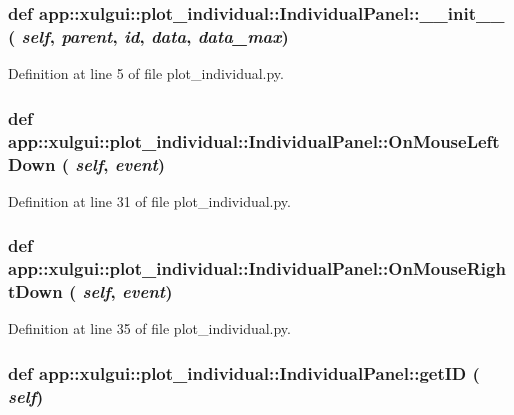 \subsubsection{\setlength{\rightskip}{0pt plus 5cm}def app::xulgui::plot\_\-individual::IndividualPanel::\_\-\_\-init\_\-\_\- ( {\em self},  {\em parent},  {\em id},  {\em data},  {\em data\_\-max})}\label{classapp_1_1xulgui_1_1plot__individual_1_1IndividualPanel_1357ff5f3ba338c72ae66861b349fec7}




Definition at line 5 of file plot\_\-individual.py.
\subsubsection{\setlength{\rightskip}{0pt plus 5cm}def app::xulgui::plot\_\-individual::IndividualPanel::OnMouseLeftDown ( {\em self},  {\em event})}\label{classapp_1_1xulgui_1_1plot__individual_1_1IndividualPanel_4df13e3b658e912d37568c6c99ad7007}




Definition at line 31 of file plot\_\-individual.py.
\subsubsection{\setlength{\rightskip}{0pt plus 5cm}def app::xulgui::plot\_\-individual::IndividualPanel::OnMouseRightDown ( {\em self},  {\em event})}\label{classapp_1_1xulgui_1_1plot__individual_1_1IndividualPanel_d0e8a24801c5632f34d6f132dbff9c80}




Definition at line 35 of file plot\_\-individual.py.
\subsubsection{\setlength{\rightskip}{0pt plus 5cm}def app::xulgui::plot\_\-individual::IndividualPanel::getID ( {\em self})}\label{classapp_1_1xulgui_1_1plot__individual_1_1IndividualPanel_f8cbb5ce5eb617e0c15d6b54aa2ca300}




